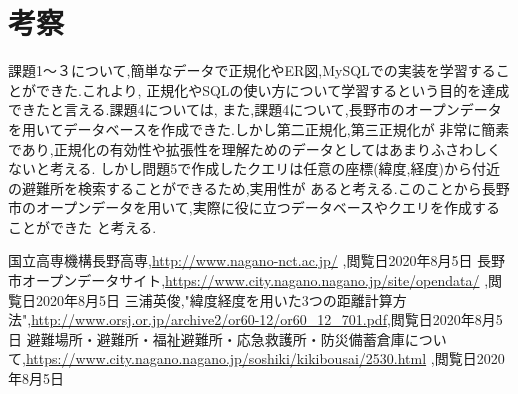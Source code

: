 \documentclass[a4j]{jarticle}
\begin{document}
    \section{考察}
        課題1～３について,簡単なデータで正規化やER図,MySQLでの実装を学習することができた.これより,
        正規化やSQLの使い方について学習するという目的を達成できたと言える.課題4については,
        また,課題4について,長野市のオープンデータを用いてデータベースを作成できた.しかし第二正規化,第三正規化が
        非常に簡素であり,正規化の有効性や拡張性を理解ためのデータとしてはあまりふさわしくないと考える.
        しかし問題5で作成したクエリは任意の座標(緯度,経度)から付近の避難所を検索することができるため,実用性が
        あると考える.このことから長野市のオープンデータを用いて,実際に役に立つデータベースやクエリを作成することができた
        と考える.

        \begin{thebibliography}{9}
            国立高専機構長野高専,\url{http://www.nagano-nct.ac.jp/} ,閲覧日2020年8月5日
            長野市オープンデータサイト,\url{https://www.city.nagano.nagano.jp/site/opendata/} ,閲覧日2020年8月5日
           三浦英俊,"緯度経度を用いた3つの距離計算方法",\url{http://www.orsj.or.jp/archive2/or60-12/or60_12_701.pdf},閲覧日2020年8月5日
            避難場所・避難所・福祉避難所・応急救護所・防災備蓄倉庫について,\url{https://www.city.nagano.nagano.jp/soshiki/kikibousai/2530.html} ,閲覧日2020年8月5日
        \end{thebibliography}
\end{document}
